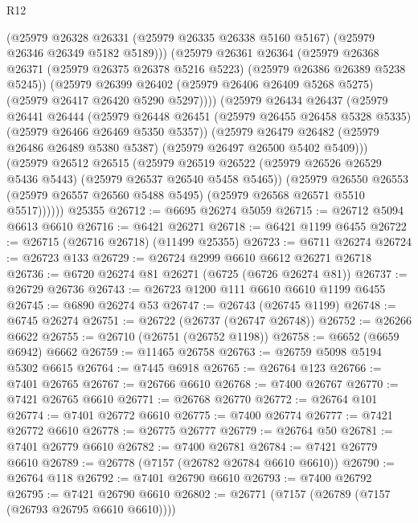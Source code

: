 \begin{lexlean}{R12}
\begin{coremodule}
            (@25979
              @26328
              @26331
              (@25979 @26335 @26338 @5160 @5167)
              (@25979 @26346 @26349 @5182 @5189)))
          (@25979
            @26361
            @26364
            (@25979
              @26368
              @26371
              (@25979 @26375 @26378 @5216 @5223)
              (@25979 @26386 @26389 @5238 @5245))
            (@25979
              @26399
              @26402
              (@25979 @26406 @26409 @5268 @5275)
              (@25979 @26417 @26420 @5290 @5297))))
        (@25979
          @26434
          @26437
          (@25979
            @26441
            @26444
            (@25979
              @26448
              @26451
              (@25979 @26455 @26458 @5328 @5335)
              (@25979 @26466 @26469 @5350 @5357))
            (@25979
              @26479
              @26482
              (@25979 @26486 @26489 @5380 @5387)
              (@25979 @26497 @26500 @5402 @5409)))
          (@25979
            @26512
            @26515
            (@25979
              @26519
              @26522
              (@25979 @26526 @26529 @5436 @5443)
              (@25979 @26537 @26540 @5458 @5465))
            (@25979
              @26550
              @26553
              (@25979 @26557 @26560 @5488 @5495)
              (@25979 @26568 @26571 @5510 @5517))))))
    @25355
@26712 := @6695 @26274 @5059
@26715 := @26712 @5094 @6613 @6610
@26716 := @6421 @26271
@26718 := @6421 @1199 @6455
@26722 := @26715 (@26716 @26718) (@11499 @25355)
@26723 := @6711 @26274
@26724 := @26723 @133
@26729 := @26724 @2999 @6610 @6612 @26271 @26718
@26736 := @6720 @26274 @81 @26271 (@6725 (@6726 @26274 @81))
@26737 := @26729 @26736
@26743 := @26723 @1200 @111 @6610 @6610 @1199 @6455
@26745 := @6890 @26274 @53
@26747 := @26743 (@26745 @1199)
@26748 := @6745 @26274
@26751 := @26722 (@26737 (@26747 @26748))
@26752 := @26266 @6622
@26755 := @26710 (@26751 (@26752 @1198))
@26758 := @6652 (@6659 @6942) @6662
@26759 := @11465 @26758
@26763 := @26759 @5098 @5194 @5302 @6615
@26764 := @7445 @6918
@26765 := @26764 @123
@26766 := @7401 @26765
@26767 := @26766 @6610
@26768 := @7400 @26767
@26770 := @7421 @26765 @6610
@26771 := @26768 @26770
@26772 := @26764 @101
@26774 := @7401 @26772 @6610
@26775 := @7400 @26774
@26777 := @7421 @26772 @6610
@26778 := @26775 @26777
@26779 := @26764 @50
@26781 := @7401 @26779 @6610
@26782 := @7400 @26781
@26784 := @7421 @26779 @6610
@26789 := @26778 (@7157 (@26782 @26784 @6610 @6610))
@26790 := @26764 @118
@26792 := @7401 @26790 @6610
@26793 := @7400 @26792
@26795 := @7421 @26790 @6610
@26802 := @26771 (@7157 (@26789 (@7157 (@26793 @26795 @6610 @6610))))

\end{coremodule}
\end{lexlean}

